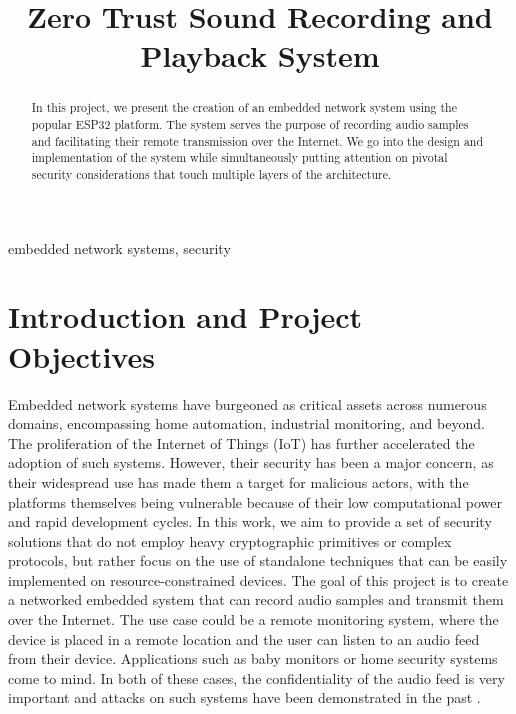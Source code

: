 \documentclass[conference]{IEEEtran}
\begin{document}
\title{Zero Trust Sound Recording and Playback System}

\author{
\and
{}
}

\maketitle

\begin{abstract}
    In this project, we present the creation of an
    embedded network system using the popular ESP32 platform. The system serves
    the purpose of recording audio samples and facilitating their remote
    transmission over the Internet. We go into the design and implementation
    of the system while simultaneously putting attention
    on pivotal security considerations that touch multiple
    layers of the architecture. 
\end{abstract}

\begin{IEEEkeywords}
embedded network systems, security
\end{IEEEkeywords}

\section{Introduction and Project Objectives}

Embedded network systems have burgeoned as critical assets across numerous
domains, encompassing home automation, industrial monitoring, and beyond. 
The proliferation of the Internet of Things (IoT) has further accelerated the
adoption of such systems\cite{IotTechEmbedded}.
However, their security has been a major concern,\cite{EmbeddedSecSurveyEU}
as their widespread use has made them a target for malicious actors, 
with the platforms themselves being vulnerable because of their low computational power and
rapid development cycles\cite{EmbeddedSecChallenges}.
In this work, we aim to provide a set of security solutions that do not employ 
heavy cryptographic primitives or complex protocols, but rather
focus on the use of standalone techniques that can be easily implemented
on resource-constrained devices.
The goal of this project is to create a networked embedded system that can record audio samples and transmit them over the Internet.
The use case could be a remote monitoring system, where the device is placed in a remote location and 
the user can listen to an audio feed from their device. Applications such as baby monitors or home security systems come to mind.
In both of these cases, the confidentiality of the audio feed is very important and
attacks on such systems have been demonstrated in the past \cite{BabyMonitorHack, VideoSurvAttacks}.
\end{document}
